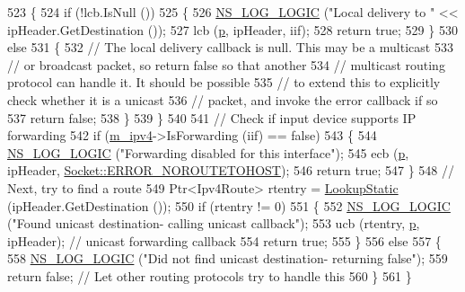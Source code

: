 \begin{DoxyCode}
523     \{
524       \textcolor{keywordflow}{if} (!lcb.IsNull ())
525         \{
526           \hyperlink{group__logging_ga88acd260151caf2db9c0fc84997f45ce}{NS\_LOG\_LOGIC} (\textcolor{stringliteral}{"Local delivery to "} << ipHeader.GetDestination ());
527           lcb (\hyperlink{lte__link__budget_8m_ac9de518908a968428863f829398a4e62}{p}, ipHeader, iif);
528           \textcolor{keywordflow}{return} \textcolor{keyword}{true};
529         \}
530       \textcolor{keywordflow}{else}
531         \{
532           \textcolor{comment}{// The local delivery callback is null.  This may be a multicast}
533           \textcolor{comment}{// or broadcast packet, so return false so that another}
534           \textcolor{comment}{// multicast routing protocol can handle it.  It should be possible}
535           \textcolor{comment}{// to extend this to explicitly check whether it is a unicast}
536           \textcolor{comment}{// packet, and invoke the error callback if so}
537           \textcolor{keywordflow}{return} \textcolor{keyword}{false};
538         \}
539     \}
540 
541   \textcolor{comment}{// Check if input device supports IP forwarding}
542   \textcolor{keywordflow}{if} (\hyperlink{classns3_1_1Ipv4StaticRouting_adc30356be1824ea40ffbd444a5d91b9f}{m\_ipv4}->IsForwarding (iif) == \textcolor{keyword}{false})
543     \{
544       \hyperlink{group__logging_ga88acd260151caf2db9c0fc84997f45ce}{NS\_LOG\_LOGIC} (\textcolor{stringliteral}{"Forwarding disabled for this interface"});
545       ecb (\hyperlink{lte__link__budget_8m_ac9de518908a968428863f829398a4e62}{p}, ipHeader, \hyperlink{classns3_1_1Socket_ada1328c5ae0c28cb2a982caf8f6d6ccaa0f8ecb5a4ddbce3bade35fa12c3d49e8}{Socket::ERROR\_NOROUTETOHOST});
546       \textcolor{keywordflow}{return} \textcolor{keyword}{true};
547     \}
548   \textcolor{comment}{// Next, try to find a route}
549   Ptr<Ipv4Route> rtentry = \hyperlink{classns3_1_1Ipv4StaticRouting_a9ee2a4c5597e9b238369ba3667121852}{LookupStatic} (ipHeader.GetDestination ());
550   \textcolor{keywordflow}{if} (rtentry != 0)
551     \{
552       \hyperlink{group__logging_ga88acd260151caf2db9c0fc84997f45ce}{NS\_LOG\_LOGIC} (\textcolor{stringliteral}{"Found unicast destination- calling unicast callback"});
553       ucb (rtentry, \hyperlink{lte__link__budget_8m_ac9de518908a968428863f829398a4e62}{p}, ipHeader);  \textcolor{comment}{// unicast forwarding callback}
554       \textcolor{keywordflow}{return} \textcolor{keyword}{true};
555     \}
556   \textcolor{keywordflow}{else}
557     \{
558       \hyperlink{group__logging_ga88acd260151caf2db9c0fc84997f45ce}{NS\_LOG\_LOGIC} (\textcolor{stringliteral}{"Did not find unicast destination- returning false"});
559       \textcolor{keywordflow}{return} \textcolor{keyword}{false}; \textcolor{comment}{// Let other routing protocols try to handle this}
560     \}
561 \}
\end{DoxyCode}



